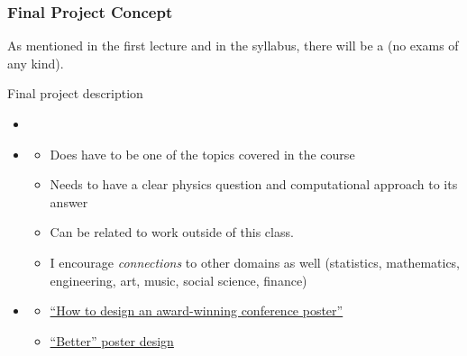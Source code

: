 \documentclass[hyperref={colorlinks=true}]{beamer}
\begin{document}
\begin{frame}%
  \frametitle{Final Project Concept}

  As mentioned in the first lecture and in the syllabus, there will be a  (no exams of any kind).
  
  \vspace{0.3cm}
  
  \begin{ucblock}{Final project  description}
    \begin{itemize}
      \item {}
      \item {}
      \begin{itemize}
        \item Does  have to be one of the topics covered in the course
        \item Needs to have a clear physics question and computational approach to its answer
        \item Can be related to work outside of this class. 
        \item I encourage \textit{connections} to other domains as well (statistics, mathematics, engineering, art, music, social science, finance)
      \end{itemize}
      \item {}
      \begin{itemize}
        \item \href{http://blogs.lse.ac.uk/impactofsocialsciences/2018/05/11/how-to-design-an-award-winning-conference-poster/}{``How to design an award-winning conference poster''}
        \item \href{https://raw.githubusercontent.com/rafaelbailo/betterposter-latex-template/master/example.png}{``Better'' poster design}
      \end{itemize}
    \end{itemize}
  \end{ucblock}

  
\end{frame}

\end{document}
